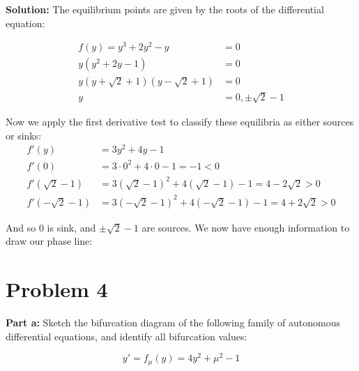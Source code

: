 \documentclass{article}
\begin{document}
\noindent\textbf{Solution:} The equilibrium points are given by the roots of the differential equation:

\begin{align*}
    f(y)=y^3+2y^2-y&=0\\
    y(y^2+2y-1)&=0\\
    y(y+\sqrt{2}+1)(y-\sqrt{2}+1)&=0\\
    y&=0,\pm\sqrt{2}-1
\end{align*}

Now we apply the first derivative test to classify these equilibria as either sources or sinks:
\medskip
\begin{align*}
    f'(y)&=3y^2+4y-1\\
    f'(0)&=3\cdot0^2+4\cdot0-1=-1<0\\
    f'(\sqrt{2}-1)&=3(\sqrt{2}-1)^2+4(\sqrt{2}-1)-1=4-2\sqrt{2}>0\\
    f'(-\sqrt{2}-1)&=3(-\sqrt{2}-1)^2+4(-\sqrt{2}-1)-1=4+2\sqrt{2}>0
\end{align*}

And so 0 is sink, and $\pm\sqrt{2}-1$ are sources. We now have enough information to draw our phase line:

\begin{center}
\end{center}

\section*{Problem 4}
\noindent\textbf{Part a:} Sketch the bifurcation diagram of the following family of autonomous differential equations, and identify all bifurcation values:

\begin{equation*}
    y'=f_\mu(y)=4y^2+\mu^2-1
\end{equation*}
\end{document}
